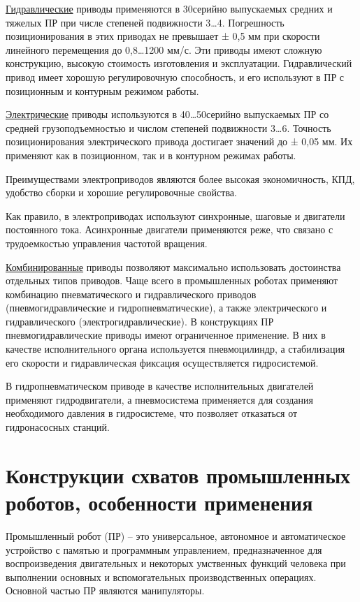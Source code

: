 \documentclass[unicode, 12pt, a4paper, oneside]{article}
\begin{document}
\underline{Гидравлические} приводы применяются в 30\textdiscount серийно выпускаемых средних и тяжелых ПР при числе степеней подвижности 3…4. Погрешность позиционирования в этих приводах не превышает ± 0,5 мм при скорости линейного перемещения до 0,8…1200 мм/с. Эти приводы имеют сложную конструкцию, высокую стоимость изготовления и эксплуатации. Гидравлический привод имеет хорошую регулировочную способность, и его используют в ПР с позиционным и контурным режимом работы.

\underline{Электрические} приводы используются в 40…50\textdiscount серийно выпускаемых ПР со средней грузоподъемностью и числом степеней подвижности 3…6. Точность позиционирования электрического привода достигает значений до ± 0,05 мм. Их применяют как в позиционном, так и в контурном режимах работы. 

Преимуществами электроприводов являются более высокая экономичность, КПД, удобство сборки и хорошие регулировочные свойства. 

Как правило, в электроприводах используют синхронные, шаговые и двигатели постоянного тока. Асинхронные двигатели применяются реже, что связано с трудоемкостью управления частотой вращения.

\underline{Комбинированные} приводы позволяют максимально использовать достоинства отдельных типов приводов. Чаще всего в промышленных роботах применяют комбинацию пневматического и гидравлического приводов (пневмогидравлические и гидропневматические), а также электрического и гидравлического (электрогидравлические). В конструкциях ПР пневмогидравлические приводы имеют ограниченное применение. В них в качестве исполнительного органа используется пневмоцилиндр, а стабилизация его скорости и гидравлическая фиксация осуществляется гидросистемой.

В гидропневматическом приводе в качестве исполнительных двигателей применяют гидродвигатели, а пневмосистема применяется для создания необходимого давления в гидросистеме, что позволяет отказаться от гидронасосных станций.

\section{Конструкции схватов промышленных роботов, особенности применения}

Промышленный робот (ПР) – это универсальное, автономное и автоматическое устройство с памятью и программным управлением, предназначенное для воспроизведения двигательных и некоторых умственных функций человека при выполнении основных и вспомогательных производственных операциях.
Основной частью ПР являются манипуляторы.
\end{document}
